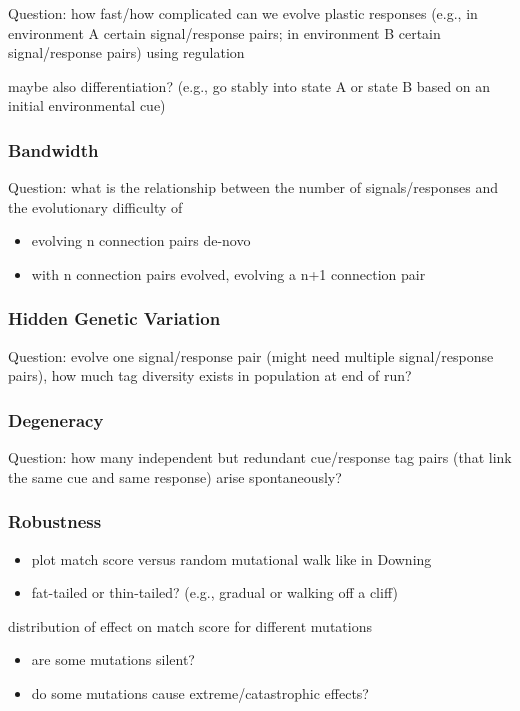 Question: how fast/how complicated can we evolve plastic responses (e.g., in environment A certain signal/response pairs; in environment B certain signal/response pairs) using regulation

maybe also differentiation?
(e.g., go stably into state A or state B based on an initial environmental cue)

\subsubsection{Bandwidth}

Question: what is the relationship between the number of signals/responses and the evolutionary difficulty of
\begin{itemize}
\item evolving n connection pairs de-novo
\item with n connection pairs evolved, evolving a n+1 connection pair
\end{itemize}

\subsubsection{Hidden Genetic Variation}

Question: evolve one signal/response pair (might need multiple signal/response pairs), how much tag diversity exists in population at end of run?

\subsubsection{Degeneracy}

Question: how many independent but redundant cue/response tag pairs (that link the same cue and same response) arise spontaneously?

\subsubsection{Robustness}

\begin{itemize}
\item plot match score versus random mutational walk like in Downing
\item fat-tailed or thin-tailed? (e.g., gradual or walking off a cliff)
\end{itemize}

distribution of effect on match score for different mutations
\begin{itemize}
\item are some mutations silent?
\item do some mutations cause extreme/catastrophic effects?
\end{itemize}

